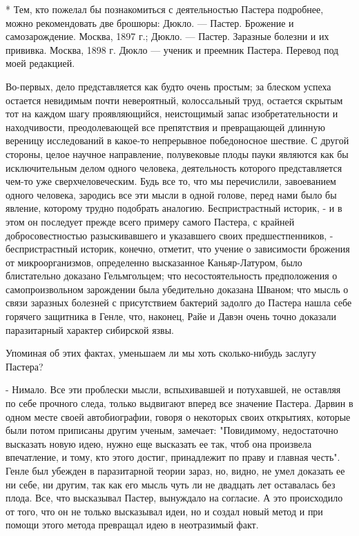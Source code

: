 * Тем, кто пожелал бы познакомиться с деятельностью Пастера подробнее,
можно рекомендовать две брошюры: Дюкло. --- Пастер. Брожение и
самозарождение. Москва, 1897 г.;  Дюкло. --- Пастер. Заразные болезни и
их прививка. Москва, 1898 г. Дюкло --- ученик и преемник Пастера.
Перевод под моей редакцией.

Во-первых, дело  представляется  как  будто очень  простым;  за  блеском
успеха остается невидимым почти невероятный, колоссальный труд, остается
скрытым  тот   на   каждом   шагу   проявляющийся,   неистощимый   запас
изобретательности  и  находчивости,  преодолевающей  все  препятствия  и
превращающей  длинную  вереницу  исследований  в  какое-то   непрерывное
победоносное шествие.  С  другой  стороны,  целое  научное  направление,
полувековые плоды  пауки являются  как  бы исключительным  делом  одного
человека,    деятельность    которого    представляется    чем-то    уже
сверхчеловеческим. Будь все то,  что мы перечислили, завоеванием  одного
человека, зародись все  эти мысли  в одной  голове, перед  нами было  бы
явление, которому трудно подобрать аналогию. Беспристрастный историк,  -
и в этом  он последует прежде  всего примеру самого  Пастера, с  крайней
добросовестностью разыскивавшего и указавшего своих предшестпенников,  -
беспристрастный историк,  конечно,  отметит, что  учение  о  зависимости
брожения от  микроорганизмов,  определенно  высказанное  Каньяр-Латуром,
было   блистательно   доказано   Гельмгольцем;   что   несостоятельность
предположения о  самопроизвольном зарождении  была убедительно  доказана
Шваном; что  мысль о  связи заразных  болезней с  присутствием  бактерий
задолго до Пастера нашла себе горячего защитника в Генле, что,  наконец,
Райе и Давэн очень точно доказали паразитарный характер сибирской язвы.

Упоминая об этих  фактах, уменьшаем  ли мы  хоть сколько-нибудь  заслугу
Пастера?

- Нимало.  Все  эти  проблески  мысли,  вспыхивавшей  и  потухавшей,  не
оставляя по себе  прочного следа, только  выдвигают вперед все  значение
Пастера. Дарвин в  одном месте своей  автобиографии, говоря о  некоторых
своих открытиях, которые были  потом приписаны другим ученым,  замечает:
"Повидимому, недостаточно высказать новую  идею, нужно еще высказать  ее
так,  чтоб  она  произвела  впечатление,  и  тому,  кто  этого   достиг,
принадлежит по праву и главная честь". Генле был убежден в  паразитарной
теории зараз, но, видно, не умел доказать ее ни себе, ни другим, так как
его мысль  чуть  ли не  двадцать  лет  оставалась без  плода.  Все,  что
высказывал Пастер, вынуждало на согласие. А это происходило от того, что
он не только высказывал идеи, но и создал новый метод и при помощи этого
метода превращал идею в неотразимый факт.

